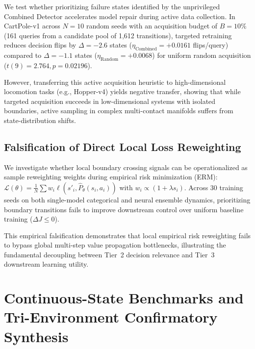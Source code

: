 \documentclass[journal,10pt,twocolumn]{IEEEtran}
\begin{document}
We test whether prioritizing failure states identified by the unprivileged Combined Detector accelerates model repair during active data collection. In CartPole-v1 across $N=10$ random seeds with an acquisition budget of $B = 10\%$ (161 queries from a candidate pool of 1,612 transitions), targeted retraining reduces decision flips by $\Delta = -2.6$ states ($\eta_{\mathrm{Combined}} = +0.0161$ flips/query) compared to $\Delta = -1.1$ states ($\eta_{\mathrm{Random}} = +0.0068$) for uniform random acquisition ($t(9) = 2.764, p = 0.02196$). 

However, transferring this active acquisition heuristic to high-dimensional locomotion tasks (e.g., Hopper-v4) yields negative transfer, showing that while targeted acquisition succeeds in low-dimensional systems with isolated boundaries, active sampling in complex multi-contact manifolds suffers from state-distribution shifts.

\subsection{Falsification of Direct Local Loss Reweighting}
\label{subsec:falsification_loss_reweighting}

We investigate whether local boundary crossing signals can be operationalized as sample reweighting weights during empirical risk minimization (ERM): $\mathcal{L}(\theta) = \frac{1}{N}\sum w_i \ell(s'_i, \hat{P}_\theta(s_i, a_i))$ with $w_i \propto (1 + \lambda s_i)$. 
Across 30 training seeds on both single-model categorical and neural ensemble dynamics, prioritizing boundary transitions fails to improve downstream control over uniform baseline training ($\Delta J \le 0$). 

This empirical falsification demonstrates that local empirical risk reweighting fails to bypass global multi-step value propagation bottlenecks, illustrating the fundamental decoupling between Tier~2 decision relevance and Tier~3 downstream learning utility.

\section{Continuous-State Benchmarks and Tri-Environment Confirmatory Synthesis}
\label{sec:continuous_state_replication}
\end{document}
